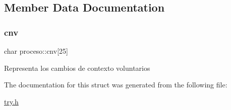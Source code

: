 \subsection{Member Data Documentation}
\mbox{\label{structproceso_a3f23ac5a5301973fede765cd4b5080d9}} 
\subsubsection{\texorpdfstring{cnv}{cnv}}
{\footnotesize\ttfamily char proceso\+::cnv\mbox{[}25\mbox{]}}

Representa los cambios de contexto voluntarios 

The documentation for this struct was generated from the following file\+:\begin{DoxyCompactItemize}
\item 
\hyperlink{try_8h}{try.\+h}\end{DoxyCompactItemize}
